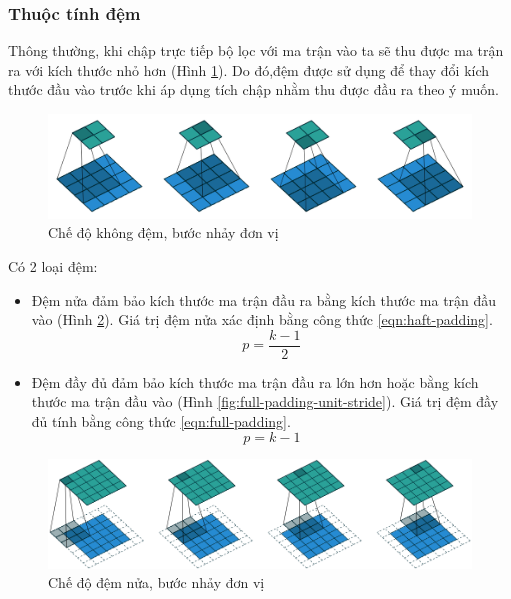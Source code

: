\subsubsection{Thuộc tính đệm}

Thông thường, khi chập trực tiếp bộ lọc với ma trận vào ta sẽ thu được ma trận ra với kích thước nhỏ hơn (Hình \ref{fig:no-padding-unit-stride}). Do đó,đệm được sử dụng để thay đổi kích thước đầu vào trước khi áp dụng tích chập nhằm thu được đầu ra theo ý muốn.

\begin{figure}[h]
	\centering
	\includegraphics[width=0.9\linewidth]{images/no-padding-unit-stride}
	\caption{Chế độ không đệm, bước nhảy đơn vị}
	\label{fig:no-padding-unit-stride}
\end{figure}

Có 2 loại đệm:
\begin{itemize}
	\item Đệm nửa đảm bảo kích thước ma trận đầu ra bằng kích thước ma trận đầu vào (Hình \ref{fig:half-padding-unit-stride1}). Giá trị đệm nửa xác định bằng công thức \ref{eqn:haft-padding}.
	\begin{equation}\label{eqn:haft-padding}
		p = \frac{k-1}{2}
	\end{equation}
	\item Đệm đầy đủ đảm bảo kích thước ma trận đầu ra lớn hơn hoặc bằng kích thước ma trận đầu vào (Hình \ref{fig:full-padding-unit-stride}). Giá trị đệm đầy đủ tính bằng công thức \ref{eqn:full-padding}.
	\begin{equation}\label{eqn:full-padding}
		p = k-1
	\end{equation}
\end{itemize}
\begin{figure}
	\centering
	\includegraphics[width=0.9\linewidth]{images/half-padding-unit-stride1}
	\caption{Chế độ đệm nửa, bước nhảy đơn vị}
	\label{fig:half-padding-unit-stride1}
\end{figure}

